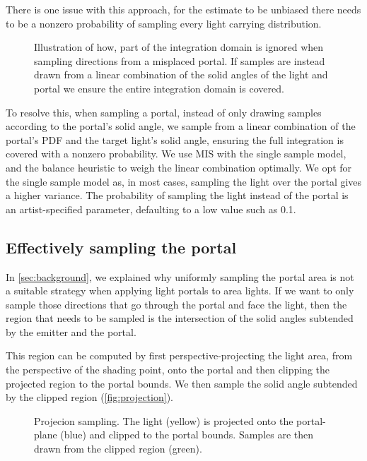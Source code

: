 There is one issue with this approach, for the estimate to be unbiased there needs to be a nonzero probability of sampling every light carrying distribution.
\begin{figure}[H]
  \centering
  \def\svgwidth{0.6\columnwidth}
  
  \caption{Illustration of how, part of the integration domain is ignored when sampling directions from a misplaced portal. If samples are instead drawn from a linear combination of the solid angles of the light and portal we ensure the entire integration domain is covered.}
  \label{fig:misplaced_portala}
\end{figure}

To resolve this, when sampling a portal, instead of only drawing samples according to the portal's solid angle, we sample from a linear combination of the portal's PDF and the target light's solid angle, ensuring the full integration is covered with a nonzero probability. We use MIS with the single sample model, and the balance heuristic \cite*[]{veachROBUSTMONTECARLO} to weigh the linear combination optimally. We opt for the single sample model as, in most cases, sampling the light over the portal gives a higher variance. The probability of sampling the light instead of the portal is an artist-specified parameter, defaulting to a low value such as 0.1.

\subsection{Effectively sampling the portal}
\label{sec:proj-sampling}

In \autoref{sec:background}, we explained why uniformly sampling the portal area is not a suitable strategy when applying light portals to area lights. If we want to only sample those directions that go through the portal and face the light, then the region that needs to be sampled is the intersection of the solid angles subtended by the emitter and the portal.

This region can be computed by first perspective-projecting the light area, from the perspective of the shading point, onto the portal and then clipping the projected region to the portal bounds. We then sample the solid angle subtended by the clipped region (\autoref{fig:projection}).

\begin{figure}[H]
  \centering
  \def\svgwidth{0.65\columnwidth}
  
  \caption{Projecion sampling. The light (yellow) is projected onto the portal-plane (blue) and clipped to the portal bounds. Samples are then drawn from the clipped region (green).}
  \label{fig:projection}
\end{figure} 

